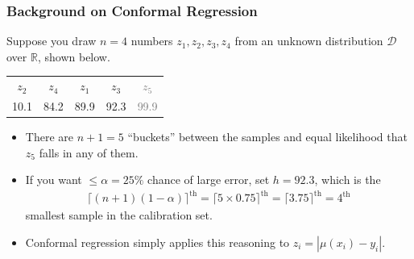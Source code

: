 \documentclass[handout]{beamer}
\begin{document}
\begin{frame}
    \frametitle{Background on Conformal Regression \cite{lei2018distribution}}

    Suppose you draw $n=4$ numbers $z_1, z_2, z_3, z_4$ from an unknown distribution $\mathcal{D}$ over $\mathbb{R}$, shown below.


    \begin{center}
    \begin{tabular}{ccccc}
    $z_2$ & $z_4$ & $z_1$ & $z_3$ & \textcolor{gray}{$z_5$} \\
    10.1 & 84.2 & 89.9 & 92.3 & \textcolor{gray}{99.9}
    \end{tabular}
    \end{center}
    

    \begin{itemize}
    \item There are $n+1=5$ ``buckets'' between the samples and equal likelihood that $z_5$ falls in any of them.
    
    
    \item If you want $\leq \alpha = 25\%$ chance of large error, set $h = 92.3$, which is the
    \begin{align*}
    \lceil (n+1)(1-\alpha)\rceil^\text{th} = \lceil 5\times 0.75\rceil^\text{th} = \lceil 3.75\rceil^\text{th} = 4^\text{th}
    \end{align*}
    smallest sample in the calibration set.


    \item Conformal regression simply applies this reasoning to $z_i = |\mu(x_i) - y_i|$.
    \end{itemize}

\end{frame}
\end{document}
